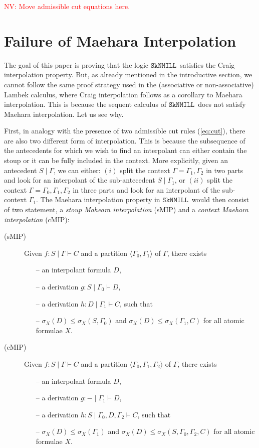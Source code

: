\documentclass[sn-mathphys-num]{sn-jnl}%
\newcommand{\GG}{\Gamma}
\newcommand{\vd}{\vdash}
\newcommand{\SkNMILL}{$\mathtt{SkNMILL}$}
\newcommand{\gs}[1]{\sigma_{X} (#1)}
\newcommand{\sMIP}{\textsf{sMIP}}
\newcommand{\cMIP}{\textsf{cMIP}}
\newcommand{\niccolo}[1]{\textcolor{red}{NV: #1}}
\theoremstyle{thmstyleone}%
\theoremstyle{thmstyletwo}%
\theoremstyle{thmstylethree}%
\begin{document}
\niccolo{Move admissible cut equations here.}


\section{Failure of Maehara Interpolation}\label{sec:failure}

The goal of this paper is proving that the logic \SkNMILL~satisfies the Craig interpolation property. But, as already mentioned in the introductive section, we cannot follow the same proof strategy used in the (associative or non-associative) Lambek calculus, where Craig interpolation follows as a corollary to Maehara interpolation. This is because the sequent calculus of \SkNMILL~does not satisfy Maehara interpolation. Let us see why.

First, in analogy with the presence of two admissible cut rules (\ref{eq:cut}), there are also two different form of interpolation. This is because the subsequence of the antecedents for which we wish to find an interpolant can either contain the stoup or it can be fully included in the context. More explicitly, given an antecedent $S \mid \Gamma$, we can either: $(i)$ split the context $\Gamma = \Gamma_1,\Gamma_2$ in two parts and look for an interpolant of the sub-antecedent $S \mid \Gamma_1$, or $(ii)$ split the context $\Gamma = \Gamma_0,\Gamma_1,\Gamma_2$ in three parts and look for an interpolant of the sub-context $\Gamma_1$.
The Maehara interpolation property in \SkNMILL~would then consist of two statement, a \emph{stoup Maheara interpolation} (\sMIP) and a \emph{context Maehara interpolation} (\cMIP):
\begin{description}
\item[(\sMIP)] Given $f: S \mid \Gamma \vd C$ and a partition $\langle \GG_0,\GG_1 \rangle$ of $\GG$, there exists  
\begin{itemize}
  \item[--] an interpolant formula $D$,
  \item[--] a derivation $g : S \mid \GG_0 \vd D$,
  \item[--] a derivation $h : D \mid \GG_1 \vd C$, such that
  \item[--] $\gs{D} \leq \gs{S , \GG_0}$ and $\gs{D} \leq \gs{\GG_1 , C}$ for all atomic formulae $X$.
\end{itemize}
\item[(\cMIP)] Given $f: S \mid \Gamma \vd C$ and a partition $\langle \GG_0,\GG_1, \GG_2 \rangle$ of $\GG$, there exists  
    \begin{itemize}
      \item[--] an interpolant formula $D$,
    \item[--] a derivation $g : {-} \mid \GG_1 \vd D$,
    \item[--] a derivation $h : S \mid \GG_0, D, \GG_2 \vd C$, such that
    \item[--] $\gs{D} \leq \gs{\GG_1}$ and $\gs{D} \leq \gs{S , \GG_0 , \GG_2 , C}$ for all atomic formulae $X$.    
  \end{itemize}
\end{description}
\end{document}
